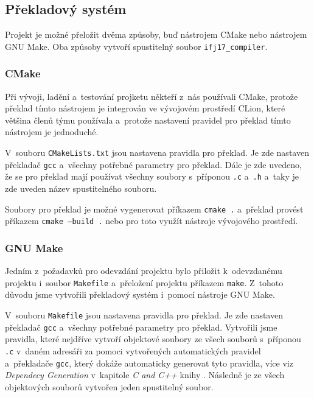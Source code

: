 \documentclass[a4paper, 11pt]{article}
\begin{document}
	\subsection{Překladový systém}

	Projekt je možné přeložit dvěma způsoby, buď nástrojem CMake nebo nástrojem GNU Make. Oba způsoby vytvoří
	spustitelný soubor \texttt{ifj17\_compiler}.

	\subsubsection{CMake}

	Při vývoji, ladění a~testování projketu někteří z~nás používali CMake, protože překlad tímto nástrojem
	je integrován ve vývojovém prostředí CLion, které většina členů týmu používala a~protože nastavení pravidel
	pro překlad tímto nástrojem je jednoduché.

	V~souboru \texttt{CMakeLists.txt} jsou nastavena pravidla pro překlad. Je zde nastaven překladač \texttt{gcc}
	a~všechny potřebné parametry pro překlad. Dále je zde uvedeno, že se pro překlad mají používat všechny soubory s~příponou
	\texttt{.c} a~\texttt{.h} a~taky je zde uveden název spustitelného souboru.

	Soubory pro překlad je možné vygenerovat příkazem \texttt{cmake~.} a~překlad provést příkazem \texttt{cmake~--build~.}
	nebo pro toto využít nástroje vývojového prostředí.

	\subsubsection{GNU Make}

	Jedním z~požadavků pro odevzdání projektu bylo přiložit k~odevzdanému projektu i~soubor \texttt{Makefile} a~přeložení
	projektu příkazem \texttt{make}. Z~tohoto důvodu jsme vytvořili překladový systém i~pomocí nástroje GNU Make.

	V~souboru \texttt{Makefile} jsou nastavena pravidla pro překlad. Je zde nastaven překladač \texttt{gcc}
	a~všechny potřebné parametry pro překlad. Vytvořili jsme pravidla, které nejdříve vytvoří objektové soubory
	ze všech souborů s~příponou \texttt{.c} v~daném adresáři za pomoci vytvořených automatických pravidel a~překladače \texttt{gcc},
	který dokáže automaticky generovat tyto pravidla, více viz \emph{Dependecy Generation} v~kapitole \emph{C and C++}
	knihy \cite{Mecklenburgc2005}. Následně je ze všech objektových souborů vytvořen jeden spustitelný
	soubor.
\end{document}
